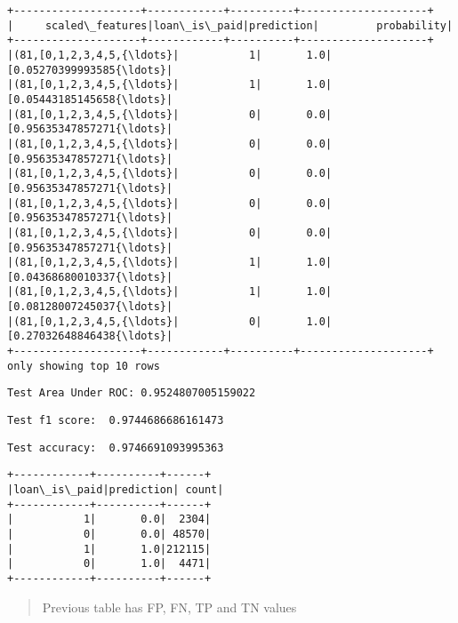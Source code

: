 \documentclass[11pt]{article}
\begin{document}
    \begin{Verbatim}[commandchars=\\\{\}]
+--------------------+------------+----------+--------------------+
|     scaled\_features|loan\_is\_paid|prediction|         probability|
+--------------------+------------+----------+--------------------+
|(81,[0,1,2,3,4,5,{\ldots}|           1|       1.0|[0.05270399993585{\ldots}|
|(81,[0,1,2,3,4,5,{\ldots}|           1|       1.0|[0.05443185145658{\ldots}|
|(81,[0,1,2,3,4,5,{\ldots}|           0|       0.0|[0.95635347857271{\ldots}|
|(81,[0,1,2,3,4,5,{\ldots}|           0|       0.0|[0.95635347857271{\ldots}|
|(81,[0,1,2,3,4,5,{\ldots}|           0|       0.0|[0.95635347857271{\ldots}|
|(81,[0,1,2,3,4,5,{\ldots}|           0|       0.0|[0.95635347857271{\ldots}|
|(81,[0,1,2,3,4,5,{\ldots}|           0|       0.0|[0.95635347857271{\ldots}|
|(81,[0,1,2,3,4,5,{\ldots}|           1|       1.0|[0.04368680010337{\ldots}|
|(81,[0,1,2,3,4,5,{\ldots}|           1|       1.0|[0.08128007245037{\ldots}|
|(81,[0,1,2,3,4,5,{\ldots}|           0|       1.0|[0.27032648846438{\ldots}|
+--------------------+------------+----------+--------------------+
only showing top 10 rows

    \end{Verbatim}

    \begin{Verbatim}[commandchars=\\\{\}]
Test Area Under ROC: 0.9524807005159022
    \end{Verbatim}

    \begin{Verbatim}[commandchars=\\\{\}]
Test f1 score:  0.9744686686161473
    \end{Verbatim}

    \begin{Verbatim}[commandchars=\\\{\}]
Test accuracy:  0.9746691093995363
    \end{Verbatim}

    \begin{Verbatim}[commandchars=\\\{\}]
+------------+----------+------+
|loan\_is\_paid|prediction| count|
+------------+----------+------+
|           1|       0.0|  2304|
|           0|       0.0| 48570|
|           1|       1.0|212115|
|           0|       1.0|  4471|
+------------+----------+------+

    \end{Verbatim}

    \begin{quote}
Previous table has FP, FN, TP and TN values
\end{quote}


    
    
    
\end{document}
